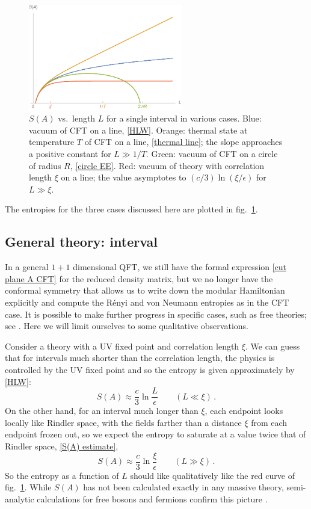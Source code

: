 \documentclass[11pt]{article}
\begin{document}
\begin{figure}[tbp]
\centering
\includegraphics[width=0.6\textwidth]{figs/EEs1d}
\caption{\label{fig:EEs1d}
$S(A)$ vs.\ length $L$ for a single interval in various cases. Blue: vacuum of CFT on a line, \eqref{HLW}. Orange: thermal state at temperature $T$ of CFT on a line, \eqref{thermal line}; the slope approaches a positive constant for $L\gg1/T$. Green: vacuum of CFT on a circle of radius $R$, \eqref{circle EE}. Red: vacuum of theory with correlation length $\xi$ on a line; the value asymptotes to $(c/3)\ln(\xi/\epsilon)$ for $L\gg\xi$.
}
\end{figure}

The entropies for the three cases discussed here are plotted in fig.\ \ref{fig:EEs1d}.


\subsection{General theory: interval}
\label{sec:one interval general}

In a general $1+1$ dimensional QFT, we still have the formal expression \eqref{cut plane A CFT} for the reduced density matrix, but we no longer have the conformal symmetry that allows us to write down the modular Hamiltonian explicitly and compute the R\'enyi and von Neumann entropies as in the CFT case. It is possible to make further progress in specific cases, such as free theories; see \cite{Casini:2009sr}. Here we will limit ourselves to some qualitative observations.

Consider a theory with a UV fixed point and correlation length $\xi$. We can guess that for intervals much shorter than the correlation length, the physics is controlled by the UV fixed point and so the entropy is given approximately by \eqref{HLW}:
\begin{equation}\label{gapped short}
S(A)\approx\frac{c}3\ln\frac L\epsilon\qquad (L\ll\xi)\,.
\end{equation}
On the other hand, for an interval much longer than $\xi$, each endpoint looks locally like Rindler space, with the fields farther than a distance $\xi$ from each endpoint frozen out, so we expect the entropy to saturate at a value twice that of Rindler space, \eqref{S(A) estimate},
\begin{equation}\label{gapped long}
S(A)\approx\frac c3\ln\frac\xi\epsilon\qquad (L\gg\xi)\,.
\end{equation}
So the entropy as a function of $L$ should like qualitatively like the red curve of fig.\ \ref{fig:EEs1d}. While $S(A)$ has not been calculated exactly in any massive theory, semi-analytic calculations for free bosons and fermions confirm this picture \cite{Calabrese:2004eu,Casini:2005rm}.
\end{document}
